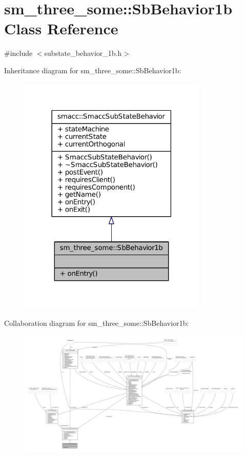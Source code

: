 \hypertarget{classsm__three__some_1_1SbBehavior1b}{}\section{sm\+\_\+three\+\_\+some\+:\+:Sb\+Behavior1b Class Reference}
\label{classsm__three__some_1_1SbBehavior1b}


{\ttfamily \#include $<$substate\+\_\+behavior\+\_\+1b.\+h$>$}



Inheritance diagram for sm\+\_\+three\+\_\+some\+:\+:Sb\+Behavior1b\+:
\nopagebreak
\begin{figure}[H]
\begin{center}
\leavevmode
\includegraphics[width=254pt]{classsm__three__some_1_1SbBehavior1b__inherit__graph}
\end{center}
\end{figure}


Collaboration diagram for sm\+\_\+three\+\_\+some\+:\+:Sb\+Behavior1b\+:
\nopagebreak
\begin{figure}[H]
\begin{center}
\leavevmode
\includegraphics[width=350pt]{classsm__three__some_1_1SbBehavior1b__coll__graph}
\end{center}
\end{figure}
